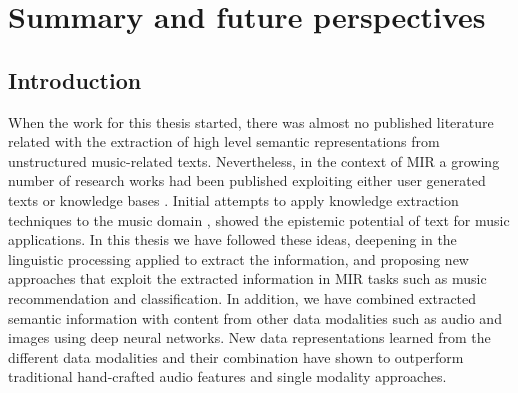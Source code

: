 
\chapter{Summary and future perspectives}
\label{sec:conclusion}

\section{Introduction}

When the work for this thesis started, there was almost no published literature related with the extraction of high level semantic representations from unstructured music-related texts. Nevertheless, in the context of MIR a growing number of research works had been published exploiting either user generated texts \citep{Celma2006,lamere2008social,Whitman2002,Knees2013} or knowledge bases \citep{sordo1788,Celma:ISWC06,dbrec1,Ostuni2013}. Initial attempts to apply knowledge extraction techniques to the music domain \citep{Tata2010,Knees2011,Sordo2012}, showed the epistemic potential of text for music applications. In this thesis we have followed these ideas, deepening in the linguistic processing applied to extract the information, and proposing new approaches that exploit the extracted information in MIR tasks such as music recommendation and classification. In addition, we have combined extracted semantic information with content from other data modalities such as audio and images using deep neural networks. New data representations learned from the different data modalities and their combination have shown to outperform traditional hand-crafted audio features and single modality approaches.

